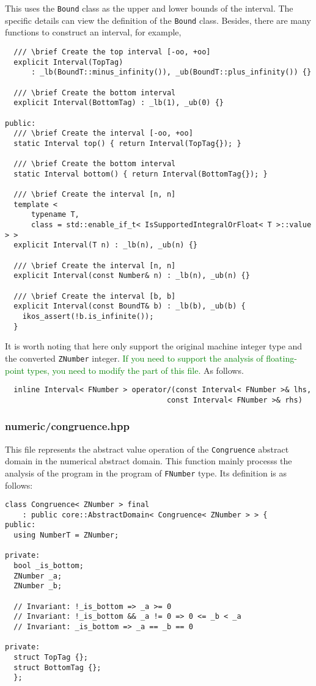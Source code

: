 \documentclass[12pt]{article}
\begin{document}
This uses the \texttt{Bound} class as the upper and lower bounds of the interval. The specific details can view the definition of the \texttt{Bound} class. Besides, there are many functions to construct an interval, for example,
\begin{lstlisting}
  /// \brief Create the top interval [-oo, +oo]
  explicit Interval(TopTag)
      : _lb(BoundT::minus_infinity()), _ub(BoundT::plus_infinity()) {}

  /// \brief Create the bottom interval
  explicit Interval(BottomTag) : _lb(1), _ub(0) {}

public:
  /// \brief Create the interval [-oo, +oo]
  static Interval top() { return Interval(TopTag{}); }

  /// \brief Create the bottom interval
  static Interval bottom() { return Interval(BottomTag{}); }

  /// \brief Create the interval [n, n]
  template <
      typename T,
      class = std::enable_if_t< IsSupportedIntegralOrFloat< T >::value > >
  explicit Interval(T n) : _lb(n), _ub(n) {}

  /// \brief Create the interval [n, n]
  explicit Interval(const Number& n) : _lb(n), _ub(n) {}

  /// \brief Create the interval [b, b]
  explicit Interval(const BoundT& b) : _lb(b), _ub(b) {
    ikos_assert(!b.is_infinite());
  }
\end{lstlisting}

It is worth noting that here only support the original machine integer type and the converted \texttt{ZNumber} integer. \textcolor{green}{If you need to support the analysis of floating-point types, you need to modify the part of this file.} As follows.
\begin{lstlisting}
  inline Interval< FNumber > operator/(const Interval< FNumber >& lhs,
                                     const Interval< FNumber >& rhs)
\end{lstlisting}

\subsubsection{numeric/congruence.hpp}
This file represents the abstract value operation of the \texttt{Congruence} abstract domain in the numerical abstract domain. This function mainly processs the analysis of the program in the program of \texttt{FNumber} type. Its definition is as follows:
\begin{lstlisting}
class Congruence< ZNumber > final
    : public core::AbstractDomain< Congruence< ZNumber > > {
public:
  using NumberT = ZNumber;

private:
  bool _is_bottom;
  ZNumber _a;
  ZNumber _b;

  // Invariant: !_is_bottom => _a >= 0
  // Invariant: !_is_bottom && _a != 0 => 0 <= _b < _a
  // Invariant: _is_bottom => _a == _b == 0

private:
  struct TopTag {};
  struct BottomTag {};
  };
\end{lstlisting}
\end{document}
